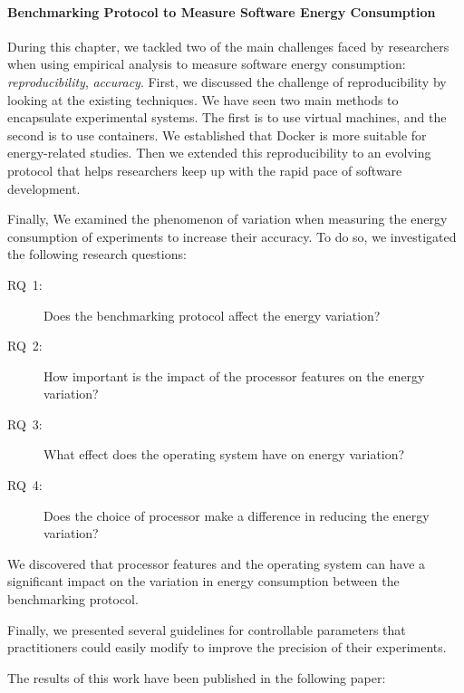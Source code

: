 \paragraph*{Benchmarking Protocol to Measure Software Energy Consumption}
During this chapter, we tackled two of the main challenges faced by researchers when using empirical analysis to measure software energy consumption: \emph{reproducibility}, \emph{accuracy}.
First, we discussed the challenge of reproducibility by looking at the existing techniques. We have seen two main methods to encapsulate experimental systems. The first is to use virtual machines, and the second is to use containers. We established that Docker is more suitable for energy-related studies. Then we extended this reproducibility to an evolving protocol that helps researchers keep up with the rapid pace of software development.

Finally, We examined the phenomenon of variation when measuring the energy consumption of experiments to increase their accuracy.
To do so, we investigated the following research questions:
\begin{description}
      \item[\textsc{RQ}~1:] Does the benchmarking protocol affect the energy variation?
      \item[\textsc{RQ}~2:] How important is the impact of the processor features on the energy variation?
      \item[\textsc{RQ}~3:] What effect does the operating system have on energy variation?
      \item[\textsc{RQ}~4:] Does the choice of processor make a difference in reducing the energy variation?
\end{description}

We discovered that processor features and the operating system can have a significant impact on the variation in energy consumption between the benchmarking protocol.

Finally, we presented several guidelines for controllable parameters that practitioners could easily modify to improve the precision of their experiments.

The results of this work have been published in the following paper:
\\

